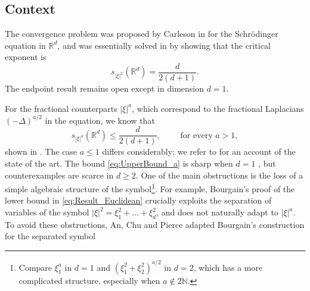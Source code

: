 \documentclass[11pt,reqno]{amsart}
\theoremstyle{definition}
\numberwithin{equation}{section}
\theoremstyle{remark}
\begin{document}
\subsection{Context}\label{sec:Context}
The convergence problem was proposed by Carleson in \cite{Carleson1980} for the Schr\"odinger equation in $\mathbb R^d$, 
and was essentially solved in \cite{DahlbergKenig1982,Bourgain2016,DuGuthLi2017,DuZhang2019}
by showing that the critical exponent is 
\begin{equation}\label{eq:Result_Euclidean}
s_{|\xi|^2}(\mathbb R^d) = \frac{d}{2(d+1)}. 
\end{equation}
The endpoint result remains open except in dimension $d=1$.

For the fractional counterparts $|\xi|^a$,
which correspond to the fractional Laplacians $(-\Delta)^{a/2}$ in the equation, 
we know that
\begin{equation}\label{eq:UpperBound_a}
   s_{|\xi|^a}(\mathbb R^d) \leq \frac{d}{2(d+1)}, \qquad \text{ for every } a > 1,
\end{equation}
shown in \cite{Sjolin1987,ChoKo2022,LiLiXiao2021}.
The case $a \leq 1$ differs considerably; we refer to \cite{ChoKoKohLee2023} for an account of the state of the art.
The bound \eqref{eq:UpperBound_a} is sharp when $d=1$ \cite{Sjolin1987}, 
but counterexamples are scarce in $d \geq 2$. 
One of the main obstructions is the loss of a simple algebraic structure of the symbol\footnote{Compare $\xi_1^a$ in $d=1$ and $(\xi_1^2 + \xi_2^2)^{a/2}$ in $d=2$, which has a more complicated structure, especially when $a \not\in 2\mathbb N$.}.
For example, Bourgain's proof \cite{Bourgain2016} of the lower bound in \eqref{eq:Result_Euclidean} crucially exploits 
the separation of variables of the symbol $|\xi|^2 = \xi_1^2 + \ldots + \xi_d^2$, and does not naturally adapt to $|\xi|^a$.  
To avoid these obstructions, 
An, Chu and Pierce \cite{AnChuPierce2023} adapted Bourgain's construction for the separated symbol
\end{document}
